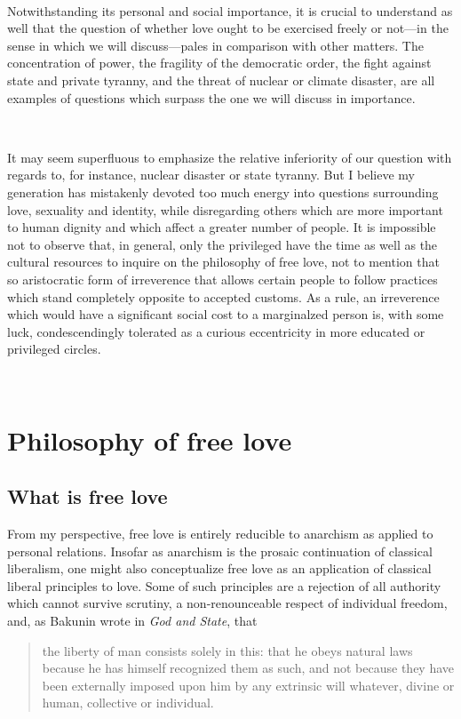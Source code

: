 \documentclass[a4paper, 12pt]{article}
\begin{document}
~

Notwithstanding its personal and social importance, it is crucial to understand
as well that the question of whether love ought to be exercised freely or
not---in the sense in which we will discuss---pales in comparison with other
matters. The concentration of power, the fragility of the democratic order, the
fight against state and private tyranny, and the threat of nuclear or climate
disaster, are all examples of questions which surpass the one we will discuss
in importance. 

~

It may seem superfluous to emphasize the relative inferiority of
our question with regards to, for instance, nuclear disaster or state tyranny.
But I believe my generation has mistakenly devoted too much energy into
questions surrounding love, sexuality and identity, while disregarding others
which are more important to human dignity and which affect a greater number of
people. It is impossible not to observe that, in general, only the privileged
have the time as well as the cultural resources to inquire on the philosophy of
free love, not to mention that so aristocratic form of irreverence that allows
certain people to follow practices which stand completely opposite to accepted
customs. As a rule, an irreverence which would have a significant social cost
to a marginalzed person is, with some luck, condescendingly tolerated as a curious
eccentricity in more educated or privileged circles.

~ 

\section{Philosophy of free love}

\subsection{What is free love}

From my perspective, free love is entirely reducible to anarchism as applied to
personal relations. Insofar as anarchism is the prosaic continuation of
classical liberalism, one might also conceptualize free love as an application
of classical liberal principles to love. Some of such principles are a
rejection of all authority which cannot survive scrutiny, a non-renounceable
respect of individual freedom, and, as Bakunin wrote in \textit{God and State},
that


\begin{quote}
    the liberty of man consists solely in this: that he obeys natural laws
    because he has himself recognized them as such, and not because they have
    been externally imposed upon him by any extrinsic will whatever, divine or
    human, collective or individual. 
\end{quote}
\end{document}
